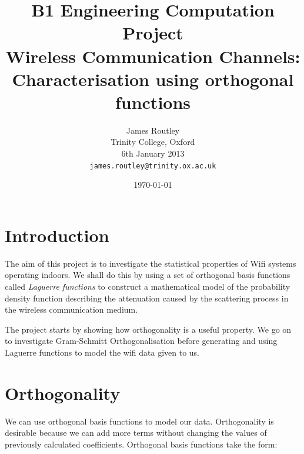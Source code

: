 \documentclass{article}
\begin{document}
\begin{titlepage}
\thispagestyle{empty}
\title{B1 Engineering Computation Project \\ Wireless Communication Channels: \\
Characterisation using orthogonal functions}
\author{James Routley \\
    Trinity College, Oxford \\
    6th January 2013 \\
    \texttt{james.routley@trinity.ox.ac.uk}}
\date{\today}
\maketitle    

\end{titlepage}














\section*{Introduction}

The aim of this project is to investigate the statistical properties of Wifi systems operating indoors. We shall do this by using a set of orthogonal basis functions called \emph{Laguerre functions} to construct a mathematical model of the probability density function describing the attenuation caused by the scattering process in the wireless communication medium. 

The project starts by showing how orthogonality is a useful property. We go on to investigate Gram-Schmitt Orthogonalisation before generating and using Laguerre functions to model the wifi data given to us. 
















\section{Orthogonality}

We can use orthogonal basis functions to model our data. Orthogonality is desirable because we can add more terms without changing the values of previously calculated coefficients. Orthogonal basis functions take the form:
\end{document}
